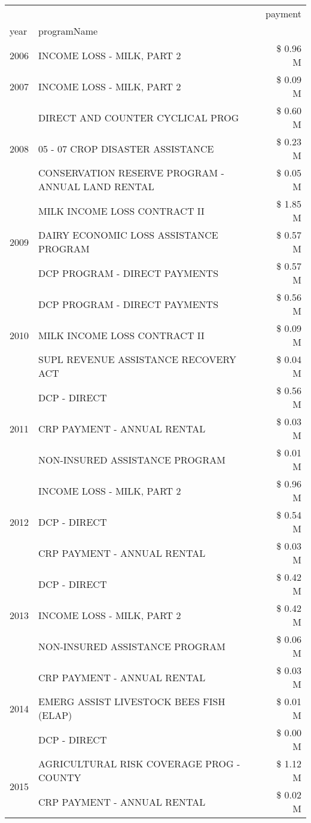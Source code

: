 \begin{tabular}{llr}
\toprule
 &  & payment \\
year & programName &  \\
\midrule
2006 & INCOME LOSS - MILK, PART 2 & \$ 0.96 M \\
\cline{1-3}
2007 & INCOME LOSS - MILK, PART 2 & \$ 0.09 M \\
\cline{1-3}
\multirow[t]{3}{*}{2008} & DIRECT AND COUNTER CYCLICAL PROG & \$ 0.60 M \\
 & 05 - 07 CROP DISASTER ASSISTANCE & \$ 0.23 M \\
 & CONSERVATION RESERVE PROGRAM - ANNUAL LAND RENTAL & \$ 0.05 M \\
\cline{1-3}
\multirow[t]{3}{*}{2009} & MILK INCOME LOSS CONTRACT II & \$ 1.85 M \\
 & DAIRY ECONOMIC LOSS ASSISTANCE PROGRAM & \$ 0.57 M \\
 & DCP PROGRAM - DIRECT PAYMENTS & \$ 0.57 M \\
\cline{1-3}
\multirow[t]{3}{*}{2010} & DCP PROGRAM - DIRECT PAYMENTS & \$ 0.56 M \\
 & MILK INCOME LOSS CONTRACT II & \$ 0.09 M \\
 & SUPL REVENUE ASSISTANCE RECOVERY ACT & \$ 0.04 M \\
\cline{1-3}
\multirow[t]{3}{*}{2011} & DCP - DIRECT & \$ 0.56 M \\
 & CRP PAYMENT - ANNUAL RENTAL & \$ 0.03 M \\
 & NON-INSURED ASSISTANCE PROGRAM & \$ 0.01 M \\
\cline{1-3}
\multirow[t]{3}{*}{2012} & INCOME LOSS - MILK, PART 2 & \$ 0.96 M \\
 & DCP - DIRECT & \$ 0.54 M \\
 & CRP PAYMENT - ANNUAL RENTAL & \$ 0.03 M \\
\cline{1-3}
\multirow[t]{3}{*}{2013} & DCP - DIRECT & \$ 0.42 M \\
 & INCOME LOSS - MILK, PART 2 & \$ 0.42 M \\
 & NON-INSURED ASSISTANCE PROGRAM & \$ 0.06 M \\
\cline{1-3}
\multirow[t]{3}{*}{2014} & CRP PAYMENT - ANNUAL RENTAL & \$ 0.03 M \\
 & EMERG ASSIST LIVESTOCK BEES FISH (ELAP) & \$ 0.01 M \\
 & DCP - DIRECT & \$ 0.00 M \\
\cline{1-3}
\multirow[t]{3}{*}{2015} & AGRICULTURAL RISK COVERAGE PROG - COUNTY & \$ 1.12 M \\
 & CRP PAYMENT - ANNUAL RENTAL & \$ 0.02 M \\

\end{tabular}
